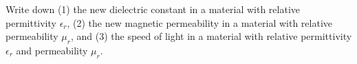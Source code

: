 

\vspace*{\fill}
\centering

Write down (1) the new dielectric constant in a material with relative permittivity $\epsilon_{r}$, (2) the new magnetic permeability in a material with relative permeability $\mu_{r}$, and (3) the speed of light in a material with relative permittivity $\epsilon_{r}$ and permeability $\mu_{r}$.

\centering
\vspace*{\fill}

